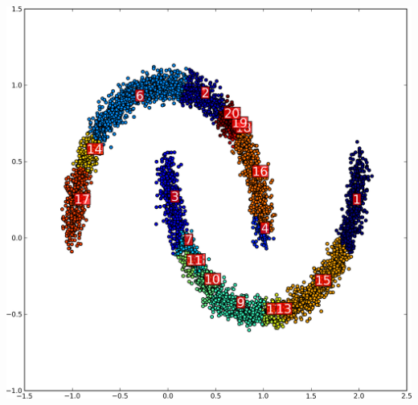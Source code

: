 \begin{frame}
\begin{columns}
\begin{column}{.6\textwidth}
            \includegraphics[width=\textwidth]{figures/moon_clust.png}
        \end{column}
    \end{columns}
\end{frame}
